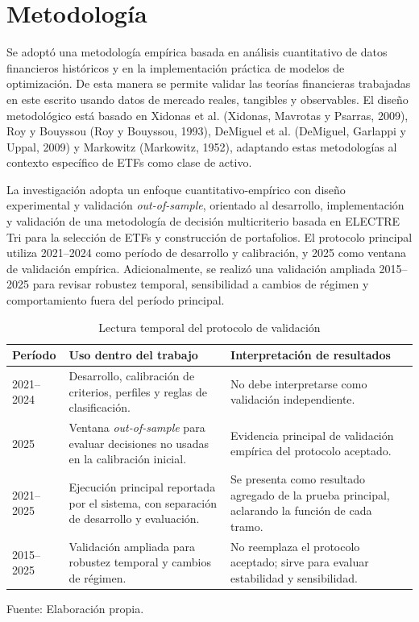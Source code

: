 \documentclass[12pt,letterpaper]{article}
\newcommand{\fuente}[1]{\begin{center}\small Fuente: #1\end{center}}
\begin{document}
\section{Metodología}

Se adoptó una metodología empírica basada en análisis cuantitativo de datos financieros históricos y en la implementación práctica de modelos de optimización. De esta manera se permite validar las teorías financieras trabajadas en este escrito usando datos de mercado reales, tangibles y observables. El diseño metodológico está basado en Xidonas et al. (Xidonas, Mavrotas y Psarras, 2009), Roy y Bouyssou (Roy y Bouyssou, 1993), DeMiguel et al. (DeMiguel, Garlappi y Uppal, 2009) y Markowitz (Markowitz, 1952), adaptando estas metodologías al contexto específico de ETFs como clase de activo.

La investigación adopta un enfoque cuantitativo-empírico con diseño experimental y validación \textit{out-of-sample}, orientado al desarrollo, implementación y validación de una metodología de decisión multicriterio basada en ELECTRE Tri para la selección de ETFs y construcción de portafolios. El protocolo principal utiliza 2021--2024 como período de desarrollo y calibración, y 2025 como ventana de validación empírica. Adicionalmente, se realizó una validación ampliada 2015--2025 para revisar robustez temporal, sensibilidad a cambios de régimen y comportamiento fuera del período principal.

\begin{table}[H]
\centering
\caption{Lectura temporal del protocolo de validación}
\label{tab:protocolo_temporal}
\begin{tabular}{p{3.5cm}p{5.2cm}p{5.2cm}}
\toprule
\textbf{Período} & \textbf{Uso dentro del trabajo} & \textbf{Interpretación de resultados} \\
\midrule
2021--2024 & Desarrollo, calibración de criterios, perfiles y reglas de clasificación. & No debe interpretarse como validación independiente. \\
2025 & Ventana \textit{out-of-sample} para evaluar decisiones no usadas en la calibración inicial. & Evidencia principal de validación empírica del protocolo aceptado. \\
2021--2025 & Ejecución principal reportada por el sistema, con separación de desarrollo y evaluación. & Se presenta como resultado agregado de la prueba principal, aclarando la función de cada tramo. \\
2015--2025 & Validación ampliada para robustez temporal y cambios de régimen. & No reemplaza el protocolo aceptado; sirve para evaluar estabilidad y sensibilidad. \\
\bottomrule
\end{tabular}
\end{table}
\fuente{Elaboración propia.}
\end{document}
